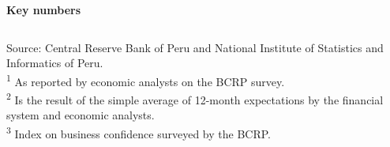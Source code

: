 \documentclass[final,a4paper]{report}
\begin{document}
\begin{vwcol}[widths={0.45,0.55},
 sep=.5cm, justify=flush,rule=0pt,indent=0em]
	\begin{minipage}{0.40\textwidth} \vspace{4cm}


		\hspace{0.2cm} \large \bfseries \textcolor{red1}{Key numbers} \normalcolor \small \normalfont
		\vspace{0.3cm}
		
		\noindent \footnotesize 
		\color{black!100}
		{\renewcommand{\arraystretch}{1.4}
			\hspace{0cm} \begin{tabular}{p{4cm}ccc} %
				 \\
%				
				\hline
			\end{tabular}
		}
		\vspace{2mm}
		
		\color{blackdark} Source: Central Reserve Bank of Peru and National Institute of Statistics and Informatics of Peru. \\
		\color{blackdark} \textsuperscript{1} As reported by economic analysts on the BCRP survey. \\
		\color{blackdark} \textsuperscript{2} Is the result of the simple average of 12-month expectations by the financial system and economic analysts. \\
		\color{blackdark} \textsuperscript{3} Index on business confidence surveyed by the BCRP.


\end{minipage}
\end{vwcol}
\end{document}
